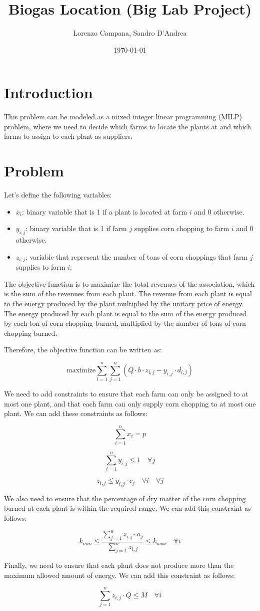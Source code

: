 \documentclass{article}
\begin{document}
\title{Biogas Location (Big Lab Project)}
\author{Lorenzo Campana, Sandro D'Andrea}
\date{\today}
\maketitle

\section{Introduction}
This problem can be modeled as a mixed integer linear programming (MILP) problem, where we need to decide which 
farms to locate the plants at and which farms to assign to each plant as suppliers.

\section{Problem}
Let's define the following variables:
\begin{itemize}
    \item $x_i$: binary variable that is 1 if a plant is located at farm $i$ and 0 otherwise.
    \item  $y_{i,j}$: binary variable that is 1 if farm $j$ supplies corn chopping to farm $i$ and 0 otherwise.
    \item  $z_{i,j}$: variable that represent the number of tons of corn choppings that farm $j$ supplies to farm $i$.

\end{itemize}

The objective function is to maximize the total revenues of the association, which is the sum of the revenues from each plant. The revenue from each plant is equal to the energy produced by the plant multiplied by the unitary price of energy. The energy produced by each plant is equal to the sum of the energy produced by each ton of corn chopping burned, multiplied by the number of tons of corn chopping burned.

Therefore, the objective function can be written as:

$$\text{maximize} \sum_{i=1}^n \sum_{j=1}^n (Q \cdot b \cdot z_{i,j} - y_{i,j} \cdot d_{i,j})$$

We need to add constraints to ensure that each farm can 
only be assigned to at most one plant, and that each farm can only supply corn chopping to at most one plant. 
We can add these constraints as follows:

$$\sum_{i=1}^n x_i = p$$

$$\sum_{i=1}^n y_{i,j} \leq 1 \quad \forall j$$

$$ z_{i,j} \leq y_{i,j} \cdot c_j \quad \forall i \quad \forall j$$

We also need to ensure that the percentage of dry matter of the corn chopping burned at each plant is within the required range. We can add this constraint as follows:

$$k_{min} \leq \frac{\sum_{j=1}^n z_{i,j} \cdot a_j}{\sum_{j=1}^n z_{i,j}} \leq k_{max} \quad \forall i$$

Finally, we need to ensure that each plant does not produce more than the maximum allowed amount of energy. We can add this constraint as follows:

$$\sum_{j=1}^n z_{i,j} \cdot Q \leq M \quad \forall i$$
\end{document}
